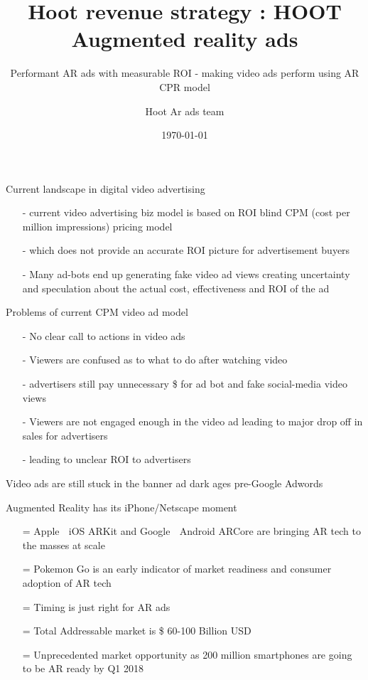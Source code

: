 \documentclass[12pt]{beamer}
\title{ Hoot revenue strategy : HOOT Augmented reality ads}
\subtitle{Performant AR ads with measurable ROI  - making video ads perform using AR CPR model}
\date{\today}
\author{Hoot Ar ads team}
\institute{Hoot Live inc., a Delaware C-corp}
\begin{document}
\maketitle



\begin{frame}[fragile]{Current landscape in digital video advertising}

\begin{itemize}
\item[-]current video advertising biz model is based on ROI blind CPM (cost per million impressions) pricing model
\item[-]which does not provide an accurate ROI picture for advertisement buyers
  \pause
\item[-]Many ad-bots end up generating fake video ad views creating uncertainty and speculation about the actual cost, effectiveness and ROI of the ad
\end{itemize}

\end{frame}
\begin{frame}[t]{Problems of current CPM video ad model}
\begin{itemize}
\item[-]No clear call to actions in video ads
\pause
\item[-]Viewers are confused as to what to do after watching video
\pause
\item[-]advertisers still pay unnecessary \$ for ad bot  and fake social-media video views
\pause
\item[-]Viewers are not engaged enough in the video ad leading to  major drop off in sales for advertisers
\pause
\item[-]leading to unclear ROI to advertisers
\end{itemize}
\pause
Video ads are still stuck in the banner ad dark ages pre-Google Adwords

\end{frame}
\begin{frame}[t]{Augmented Reality has its iPhone/Netscape moment}
\begin{itemize}
	\item[=]Apple 🍎
	 iOS ARKit and Google 🤖 Android ARCore are bringing AR tech to the masses at scale
	\pause
	\item[=]Pokemon Go is an early indicator of market readiness and consumer adoption of AR tech
	\pause
	\item[=]Timing is just right for AR ads
	\pause
	\item[=]Total Addressable market is \$ 60-100 Billion USD 
	\pause
	\item[=]Unprecedented market opportunity as 200 million smartphones are going to be AR ready by Q1 2018
\end{itemize}
\end{frame}
\end{document}
